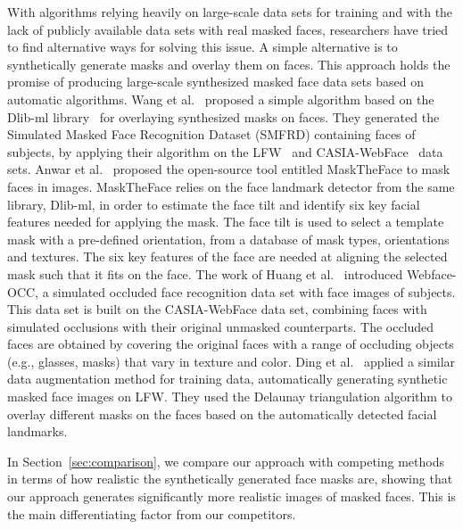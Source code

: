 \documentclass{article}
\begin{document}
With algorithms relying heavily on large-scale data sets for training and with the lack of publicly available data sets with real masked faces, researchers have tried to find alternative ways for solving this issue. A simple alternative is to synthetically generate masks and overlay them on faces. This approach holds the promise of producing large-scale synthesized masked face data sets based on automatic algorithms. 
Wang et al.~\cite{wang2020arxiv} proposed a simple algorithm based on the Dlib-ml library~\cite{dlib-ml} for overlaying synthesized masks on faces. They generated the Simulated Masked Face Recognition Dataset (SMFRD) containing  faces of  subjects, by applying their algorithm on the LFW~\cite{Huang07Tech} and CASIA-WebFace~\cite{yi2014learning} data sets. 
Anwar et al.~\cite{anwar2020arxiv} proposed the open-source tool entitled MaskTheFace to mask faces in images. MaskTheFace relies on the face landmark detector from the same library, Dlib-ml, in order to estimate the face tilt and identify six key facial features needed for applying the mask. The face tilt is used to select a template mask with a pre-defined orientation, from a database of  mask types,  orientations and  textures. The six key features of the face are needed at aligning the selected mask such that it fits on the face. 
The work of Huang et al.~\cite{huang2021icassp} introduced Webface-OCC, a simulated occluded face recognition data set with  face images of  subjects. This data set is built on the CASIA-WebFace data set, combining faces with simulated occlusions  with their original unmasked counterparts. The occluded faces are obtained by covering the original faces with a range of occluding objects (e.g., glasses, masks) that vary in texture and color. 
Ding et al.~\cite{ding2020icm} applied a similar data augmentation method for training data, automatically generating synthetic masked face images on LFW. They used the Delaunay triangulation algorithm to overlay different masks on the faces based on the automatically detected facial landmarks. 

In Section~\ref{sec:comparison}, we compare our approach with competing methods~\cite{wang2020arxiv,anwar2020arxiv,huang2021icassp} in terms of how realistic the synthetically generated face masks are, showing that our approach generates significantly more realistic images of masked faces. This is the main differentiating factor from our competitors.
\end{document}

